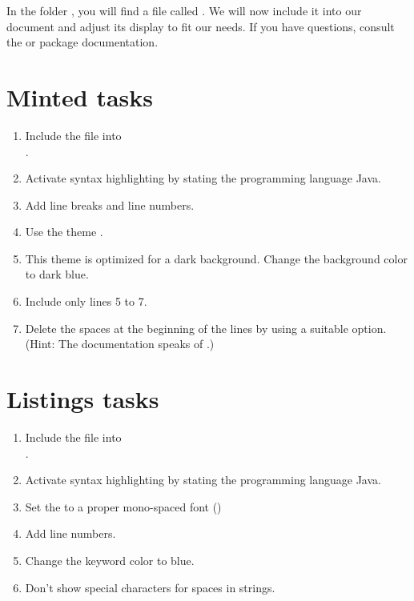 In the folder , you will find a file called .
We will now include it into our document and adjust its display to fit our needs.
If you have questions, consult the  or  package documentation.

\section*{Minted tasks}

\begin{enumerate}
  \item Include the file into \\
  .
  \item Activate syntax highlighting by stating the programming language Java.
  \item Add line breaks and line numbers.
  \item Use the theme .
  \item This theme is optimized for a dark background. Change the background color to dark blue.
  \item Include only lines 5 to 7.
  \item Delete the spaces at the beginning of the lines by using a suitable 
  option. (Hint: The documentation speaks of .)
\end{enumerate}

\section*{Listings tasks}

\begin{enumerate}
  \item Include the file into \\
  .
  \item Activate syntax highlighting by stating the programming language Java.
  \item Set the  to a proper mono-spaced font ()
  \item Add line numbers.
  \item Change the keyword color to blue.
  \item Don't show special characters for spaces in strings.
\end{enumerate}


